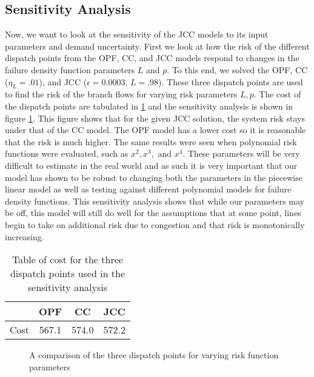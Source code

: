 \subsection{Sensitivity Analysis}\label{senseanal}
Now, we want to look at the sensitivity of the JCC models to its input parameters and demand uncertainty.  First we look at how the risk of the different dispatch points from the OPF, CC, and JCC models respond to changes in the failure density function parameters $L$ and $p$.  To this end, we solved the OPF, CC ($\eta_L=.01$), and JCC ($\epsilon=0.0003$, $L=.98$).  These three dispatch points are used to find the risk of the branch flows for varying risk parameters $L,p$. The cost of the dispatch points are tabulated in \ref{tabsense} and the sensitivity analysis is shown in figure \ref{figsense}. This figure shows that for the given JCC solution, the system risk stays under that of the CC model.  The OPF model has a lower cost so it is reasonable that the risk is much higher.  The same results were seen when polynomial risk functions were evaluated, such as $x^2,x^3,$ and $x^4$.  These parameters will be very difficult to estimate in the real world and as such it is very important that our model has shown to be robust to changing both the parameters in the piecewise linear model as well as testing against different polynomial models for failure density functions.  This sensitivity analysis shows that while our parameters may be off, this model will still do well for the assumptions that at some point, lines begin to take on additional risk due to congestion and that risk is monotonically increasing.

\begin{table}
\centering
 \begin{tabular}{ |c| c c c |}
\hline
& OPF & CC & JCC \\
\hline
\hline
Cost & 567.1 & 574.0 & 572.2\\
\hline
\end{tabular}
\caption{Table of cost for the three dispatch points used in the sensitivity analysis}\label{tabsense}
\end{table}


\begin{figure}
\centering

\caption{A comparison of the three dispatch points for varying risk function parameters}\label{figsense}
\end{figure}







